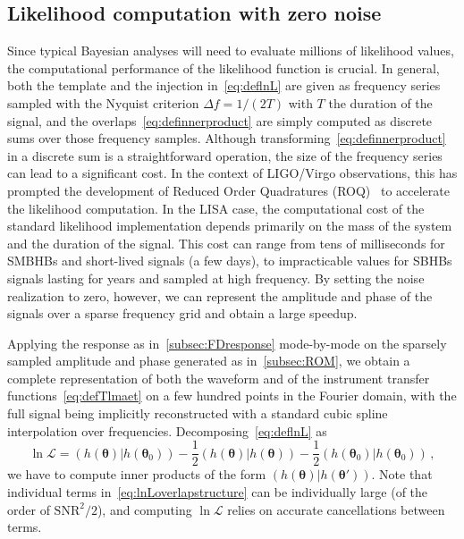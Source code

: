 \documentclass[aps,showpacs,twocolumn,prd,superscriptaddress,nofootinbib]{revtex4-1}
\newcommand{\be}{\begin{equation}}
\newcommand{\ee}{\end{equation}}
\newcommand\calL{{\mathcal{L}}}
\begin{document}

\subsection{Likelihood computation with zero noise}
\label{subsec:likelihood}

Since typical Bayesian analyses will need to evaluate millions of likelihood values, the computational performance of the likelihood function is crucial. In general, both the template and the injection in~\eqref{eq:deflnL} are given as frequency series sampled with the Nyquist criterion $\Delta f = 1/(2T)$ with $T$ the duration of the signal, and the overlaps~\eqref{eq:definnerproduct} are simply computed as discrete sums over those frequency samples. Although transforming~\eqref{eq:definnerproduct} in a discrete sum is a straightforward operation, the size of the frequency series can lead to a significant cost. In the context of LIGO/Virgo observations, this has prompted the development of Reduced Order Quadratures (ROQ)~\cite{Smith+14, Canizares+14, Smith+16} to accelerate the likelihood computation. In the LISA case, the computational cost of the standard likelihood implementation depends primarily on the mass of the system and the duration of the signal. This cost can range from tens of milliseconds for SMBHBs and short-lived signals (a few days), to impracticable values for SBHBs signals lasting for years and sampled at high frequency.
By setting the noise realization to zero, however, we can represent the amplitude and phase of the signals over a sparse frequency grid and obtain a large speedup.

Applying the response as in~\ref{subsec:FDresponse} mode-by-mode on the sparsely sampled amplitude and phase generated as in~\ref{subsec:ROM}, we obtain a complete representation of both the waveform and of the instrument transfer functions~\eqref{eq:defTlmaet} on a few hundred points in the Fourier domain, with the full signal being implicitly reconstructed with a standard cubic spline interpolation over frequencies. Decomposing~\eqref{eq:deflnL} as
\be\label{eq:lnLoverlapstructure}
	\ln \calL = \left( h(\bm{\theta}) | h(\bm{\theta}_{0}) \right)- \frac{1}{2} \left( h(\bm{\theta}) | h(\bm{\theta}) \right) - \frac{1}{2} \left( h(\bm{\theta}_{0}) | h(\bm{\theta}_{0}) \right) \,,
\ee
we have to compute inner products of the form $\left( h(\bm{\theta}) | h(\bm{\theta'}) \right)$. Note that individual terms in~\eqref{eq:lnLoverlapstructure} can be individually large (of the order of $\mathrm{SNR}^{2}/2$), and computing $\ln \calL$ relies on accurate cancellations between terms.
\end{document}
